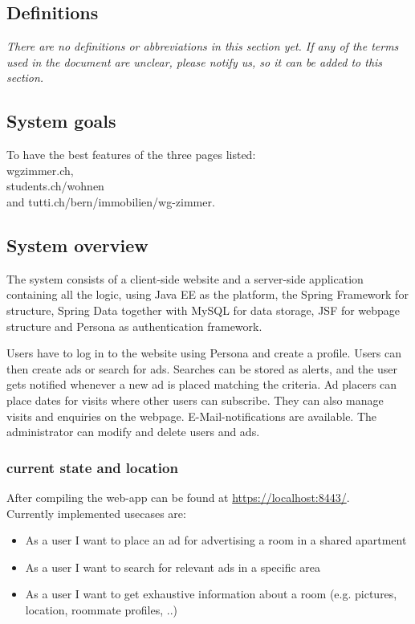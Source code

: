 \documentclass[a4wide]{article}
\begin{document}
\subsection{Definitions}
\textit{There are no definitions or abbreviations in this section yet. If any of the terms used in the document are unclear, please notify us, so it can be added to this section.}
\subsection{System goals}
To have the best features of the three pages listed: \\
wgzimmer.ch, \\
students.ch/wohnen \\
and tutti.ch/bern/immobilien/wg-zimmer.

\subsection{System overview}
The system consists of a client-side website and a server-side application containing all the logic, using Java EE as the platform, the Spring Framework for structure, Spring Data together with MySQL for data storage, JSF for webpage structure and Persona as authentication framework.

Users have to log in to the website using Persona and create a profile. Users can then create ads or search for ads. Searches can be stored as alerts, and the user gets notified whenever a new ad is placed matching the criteria. Ad placers can place dates for visits where other users can subscribe. They can also manage visits and enquiries on the webpage. E-Mail-notifications are available.
The administrator can modify and delete users and ads.

\subsubsection{current state and location}
After compiling the web-app can be found at \href{https://localhost:8443/}{https://localhost:8443/}.\\
Currently implemented usecases are: 
\begin{itemize}
\item As a user I want to place an ad for advertising a room in a shared apartment
\item As a user I want to search for relevant ads in a specific area
\item As a user I want to get exhaustive information about a room (e.g. pictures, location, roommate profiles, ..)
\end{itemize}
\end{document}
